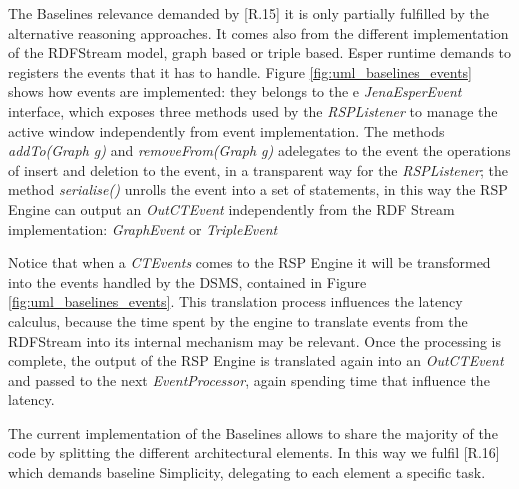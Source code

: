 The Baselines relevance demanded by [R.15] it is only partially fulfilled by the alternative reasoning approaches. It comes also from the different implementation of the RDFStream model, graph based or triple based. Esper runtime demands to registers the events that it has to handle. Figure \ref{fig:uml_baselines_events} shows how events are implemented: they belongs to the e \textit{JenaEsperEvent} interface, which exposes three methods used by the \textit{RSPListener} to manage the active window independently from event implementation. The methods \textit{addTo(Graph g)} and \textit{removeFrom(Graph g)} adelegates to the event the operations of insert and deletion to the event, in a transparent way for the \textit{RSPListener}; the method \textit{serialise()} unrolls the event into a set of statements, in this way the RSP Engine can output an \textit{OutCTEvent} independently from the RDF Stream implementation: \textit{GraphEvent} or \textit{TripleEvent}

Notice that when a \textit{CTEvents} comes to the RSP Engine it will be transformed into the events handled by the DSMS, contained in Figure \ref{fig:uml_baselines_events}. This translation process influences the latency calculus, because the time spent by the engine to translate events from the RDFStream into its internal mechanism may be relevant. Once the processing is complete, the output of the RSP Engine is translated again into an \textit{OutCTEvent} and passed to the next \textit{EventProcessor}, again spending time that influence the latency.

The current implementation of the Baselines allows to share the majority of the code by splitting the different architectural elements. In this way we fulfil [R.16] which demands baseline Simplicity, delegating to each element a specific task.

%




